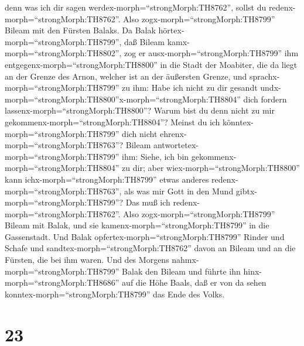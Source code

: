 denn was ich dir sagen werdex-morph=``strongMorph:TH8762'', sollst du
redenx-morph=``strongMorph:TH8762''. Also
zogx-morph=``strongMorph:TH8799'' Bileam mit den Fürsten Balaks.
 Da Balak hörtex-morph=``strongMorph:TH8799'', daß Bileam
kamx-morph=``strongMorph:TH8802'', zog er
ausx-morph=``strongMorph:TH8799'' ihm
entgegenx-morph=``strongMorph:TH8800'' in die Stadt der Moabiter, die da
liegt an der Grenze des Arnon, welcher ist an der äußersten Grenze,
 und sprachx-morph=``strongMorph:TH8799'' zu ihm: Habe ich
nicht zu dir gesandt
undx-morph=``strongMorph:TH8800''x-morph=``strongMorph:TH8804'' dich
fordern lassenx-morph=``strongMorph:TH8800''? Warum bist du denn nicht
zu mir gekommenx-morph=``strongMorph:TH8804''? Meinst du ich
könntex-morph=``strongMorph:TH8799'' dich nicht
ehrenx-morph=``strongMorph:TH8763''?  Bileam
antwortetex-morph=``strongMorph:TH8799'' ihm: Siehe, ich bin
gekommenx-morph=``strongMorph:TH8804'' zu dir; aber
wiex-morph=``strongMorph:TH8800'' kann ichx-morph=``strongMorph:TH8799''
etwas anderes redenx-morph=``strongMorph:TH8763'', als was mir Gott in
den Mund gibtx-morph=``strongMorph:TH8799''? Das muß ich
redenx-morph=``strongMorph:TH8762''.  Also
zogx-morph=``strongMorph:TH8799'' Bileam mit Balak, und sie
kamenx-morph=``strongMorph:TH8799'' in die Gassenstadt. 
Und Balak opfertex-morph=``strongMorph:TH8799'' Rinder und Schafe und
sandtex-morph=``strongMorph:TH8762'' davon an Bileam und an die Fürsten,
die bei ihm waren.  Und des Morgens
nahmx-morph=``strongMorph:TH8799'' Balak den Bileam und führte ihn
hinx-morph=``strongMorph:TH8686'' auf die Höhe Baals, daß er von da
sehen konntex-morph=``strongMorph:TH8799'' das Ende des Volks.

\hypertarget{section-22}{%
\section{23}\label{section-22}}

